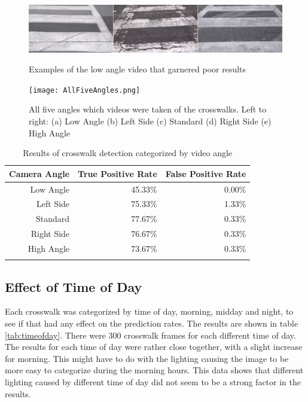 \documentclass[12pt]{ucthesis}
\newcommand{\captionfonts}{\small\bf\ssp}
\begin{document}
\begin{figure}[t]
\begin{center}
\includegraphics[width=15cm]{DownBad.png}
\captionfonts
\caption[Low Angle Video Examples]{Examples of the low angle video that garnered poor results}
\label{fig:downBadPic}
\end{center}
\end{figure}

\begin{figure}[t]
\begin{center}
\texttt{[image: AllFiveAngles.png]}
\captionfonts
\caption[All Five Different Crosswalk Angles]{All five angles which videos were taken of the crosswalks. Left to right: (a) Low Angle (b) Left Side (c) Standard (d) Right Side (e) High Angle}
\label{fig:AllFiveAngles}
\end{center}
\end{figure}

\begin{table}[t]
    \begin{longtable}{|r|r|r|}
    \hline
    Camera Angle & True Positive Rate & False Positive Rate \bigstrut\\
    \hline
    Low Angle & 45.33\% & 0.00\% \bigstrut\\
    \hline
    Left Side & 75.33\% & 1.33\% \bigstrut\\
    \hline
    Standard & 77.67\% & 0.33\% \bigstrut\\
    \hline
    Right Side & 76.67\% & 0.33\% \bigstrut\\
    \hline
    High Angle & 73.67\% & 0.33\% \bigstrut\\
    \hline

    \caption{Results of crosswalk detection categorized by video angle}
    \label{tab:downbad} 
    \end{longtable}
\end{table}

\clearpage

\subsection{Effect of Time of Day}
Each crosswalk was categorized by time of day, morning, midday and night, to see if that had any effect on the prediction rates. The results are shown in table \ref{tab:timeofday}. There were 300 crosswalk frames for each different time of day. The results for each time of day were rather close together, with a slight increase for morning. This might have to do with the lighting causing the image to be more easy to categorize during the morning hours. This data shows that different lighting caused by different time of day did not seem to be a strong factor in the results.
\end{document}
